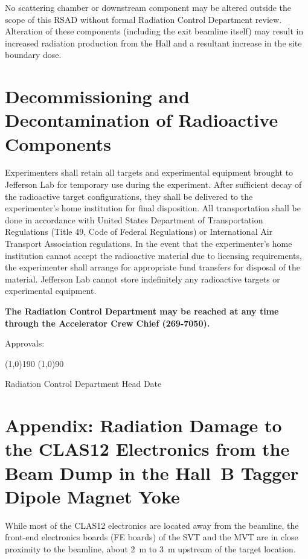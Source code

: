 \documentclass [12pt]{article}
\begin{document}
No scattering chamber or downstream component may be altered outside the scope of this RSAD 
without formal Radiation Control Department review. Alteration of these components (including 
the exit beamline itself) may result in increased radiation production from the Hall and a 
resultant increase in the site boundary dose. 

\section{Decommissioning and Decontamination of Radioactive Components}

Experimenters shall retain all targets and experimental equipment brought to Jefferson Lab for 
temporary use during the experiment. After sufficient decay of the radioactive target 
configurations, they shall be delivered to the experimenter's home institution for final 
disposition. All transportation shall be done in accordance with United States Department of 
Transportation Regulations (Title 49, Code of Federal Regulations) or International Air Transport
Association regulations. In the event that the experimenter's home institution cannot accept the 
radioactive material due to licensing requirements, the experimenter shall arrange for appropriate 
fund transfers for disposal of the material. Jefferson Lab cannot store indefinitely any radioactive 
targets or experimental equipment. 

{\bf The Radiation Control Department may be reached at any time through the
Accelerator Crew Chief (269-7050). }

\vspace{3.cm}
Approvals:

\vspace{1.cm}
\line(1,0){190}                    
\hspace{3cm}         \line(1,0){90}  

Radiation Control Department Head               \hspace{3cm}                  Date


\clearpage
\section{Appendix: Radiation Damage to the CLAS12 Electronics from the Beam Dump in the Hall~B 
Tagger Dipole Magnet Yoke}

While most of the CLAS12 electronics are located away from the beamline, the front-end electronics 
boards (FE boards) of the SVT and the MVT are in close proximity to the beamline, about 2~m to 3~m 
upstream of the target location. 
\end{document}
